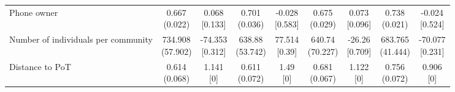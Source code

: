 {\begin{tabular}[t]{lcccccccc}
\hspace{1em}Phone owner & \makecell[c]{0.667\\(0.022)} & \makecell[c]{0.068\\{[0.133]}} & \makecell[c]{0.701\\(0.036)} & \makecell[c]{-0.028\\{[0.583]}} & \makecell[c]{0.675\\(0.029)} & \makecell[c]{0.073\\{[0.096]}} & \makecell[c]{0.738\\(0.021)} & \makecell[c]{-0.024\\{[0.524]}}\\
\hspace{1em}Number of individuals per community & \makecell[c]{734.908\\(57.902)} & \makecell[c]{-74.353\\{[0.312]}} & \makecell[c]{638.88\\(53.742)} & \makecell[c]{77.514\\{[0.39]}} & \makecell[c]{640.74\\(70.227)} & \makecell[c]{-26.26\\{[0.709]}} & \makecell[c]{683.765\\(41.444)} & \makecell[c]{-70.077\\{[0.231]}}\\
\hspace{1em}Distance to PoT & \makecell[c]{0.614\\(0.068)} & \makecell[c]{1.141\\{[0]}} & \makecell[c]{0.611\\(0.072)} & \makecell[c]{1.49\\{[0]}} & \makecell[c]{0.681\\(0.067)} & \makecell[c]{1.122\\{[0]}} & \makecell[c]{0.756\\(0.072)} & \makecell[c]{0.906\\{[0]}}\\
\bottomrule
\end{tabular}}

